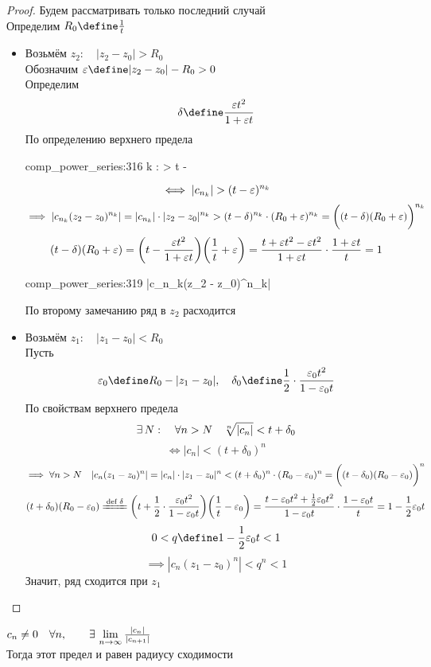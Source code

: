 \begin{proof}
	Будем рассматривать только последний случай \\
	Определим $ R_0 \define \frac1t $
	\begin{itemize}
		\item Возьмём $ z_2 : \quad |z_2 - z_0| > R_0 $ \\
		Обозначим $ \veps \define |z_2 - z_0| - R_0 > 0 $ \\
		Определим
		$$ \delta \define \frac{\veps t^2}{1 + \veps t} $$
		По определению верхнего предела
		\begin{equ}{comp_power_series:316}
			\exist {}k : \quad {} > t - \delta
		\end{equ}
		$$ \iff |c_{n_k}| > (t - \varepsilon)^{n_k} $$
		$$ \implies |c_{n_k}(z_2 - z_0)^{n_k}| = |c_{n_k}| \cdot |z_2 - z_0|^{n_k} > (t - \delta)^{n_k} \cdot (R_0 + \varepsilon)^{n_k} = \bigg( (t - \delta)(R_0 + \varepsilon) \bigg)^{n_k} $$
		$$ (t - \delta)(R_0 + \varepsilon) = \bigg( t - \frac{\varepsilon t^2}{1 + \varepsilon t} \bigg)\bigg( \frac1t + \varepsilon \bigg) = \frac{t + \varepsilon t^2 - \varepsilon t^2}{1 + \varepsilon t} \cdot \frac{1 + \varepsilon t}t = 1 $$
		\begin{equ}{comp_power_series:319}
			\implies |c_{n_k}(z_2 - z_0)^{n_k}| 
		\end{equ}
		По второму замечанию ряд в $ z_2 $ расходится
		\item Возьмём $ z_1 : \quad |z_1 - z_0| < R_0 $ \\
		Пусть
		$$ \veps_0 \define R_0 - |z_1 - z_0|, \quad \delta_0 \define \half \cdot \frac{\veps_0t^2}{1 - \veps_0t} $$
		По свойствам верхнего предела
		$$ \exists\, N : \quad \forall n > N \quad \sqrt[n]{|c_n|} < t + \delta_0 $$
		$$ \iff |c_n| < (t + \delta_0)^n $$
		$$ \implies \forall n > N \quad |c_n(z_1 - z_0)^n| = |c_n| \cdot |z_1 - z_0|^n < (t + \delta_0)^n \cdot (R_0 - \varepsilon_0)^n = \bigg( (t - \delta_0)(R_0 - \varepsilon_0) \bigg)^n $$
		$$ (t + \delta_0)(R_0 - \veps_0) \bdefeq{\delta} \bigg( t + \half \cdot \frac{\veps_0t^2}{1 - \veps_0t} \bigg) \bigg( \frac1t - \veps_0 \bigg) = \frac{t - \veps_0t^2 + \half\veps_0t^2}{1 - \veps_0t} \cdot \frac{1 - \veps_0t}{t} = 1 - \half\veps_0t $$
		$$ 0 < q \define 1 -\half \veps_0t < 1 $$
		$$ \implies |c_n(z_1 - z_0)^n| < q^n < 1 $$
		Значит, ряд сходится при $ z_1 $
	\end{itemize}
\end{proof}

\begin{theorem}
	$ c_n \ne 0 \quad \forall n, \qquad \exists\, \lim\limits_{n\to\infty} \frac{|c_n|}{|c_{n + 1}|} $ \\
	Тогда этот предел и равен радиусу сходимости
\end{theorem}

